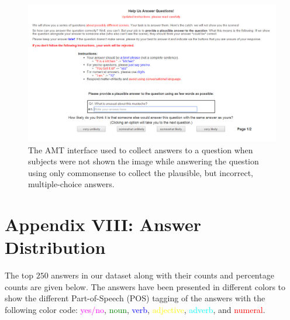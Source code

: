 \begin{figure}[h]
\centering
\includegraphics[width=1\linewidth]{figures/answer_without_image.png}
\caption{The AMT interface used to collect answers to a question when subjects were not shown the image while answering the question using only commonsense to collect the plausible, but incorrect, multiple-choice answers.}
\label{fig:answoimage}
\end{figure}
\clearpage

\section*{Appendix VIII: Answer Distribution}
\label{sec:top_ans}
\vspace*{-8cm}
The top $250$ answers in our  dataset along with their counts and percentage counts are given below. The answers have been presented in different colors to show the different Part-of-Speech (POS) tagging of the answers with the following color code: {\textcolor{magenta}{yes/no}}, {\textcolor{green}{noun}}, {\textcolor{blue}{verb}}, {\textcolor{yellow}{adjective}}, {\textcolor{cyan}{adverb}}, and {\textcolor{red}{numeral}}.

